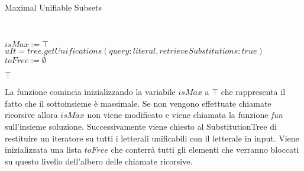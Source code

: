 \documentclass[./main.tex]{subfiles}
\begin{document}
\begin{algorithm}[H] \label{alg:mus}
    \small
    \caption{Maximal Unifiable Subsets}
    \\

$isMax := \top$\;
$uIt = tree.getUnifications(query: literal, retrieveSubstitutions: true)$\;
$toFree := \emptyset$\;

\Return $\top$\;
\end{algorithm}

La funzione comincia inizializzando la variabile $isMax$ a $\top$ che rappresenta il fatto che il sottoinsieme è massimale.
Se non vengono effettuate chiamate ricorsive allora $isMax$ non viene modificato
e viene chiamata la funzione \textit{fun} sull'insieme soluzione.
Successivamente viene chiesto al SubstitutionTree di restituire un iteratore
su tutti i letterali unificabili con il letterale in input.
Viene inizializzata una lista $toFree$ che conterrà tutti gli elementi che 
verranno bloccati su questo livello dell'albero delle chiamate ricorsive.
\end{document}
